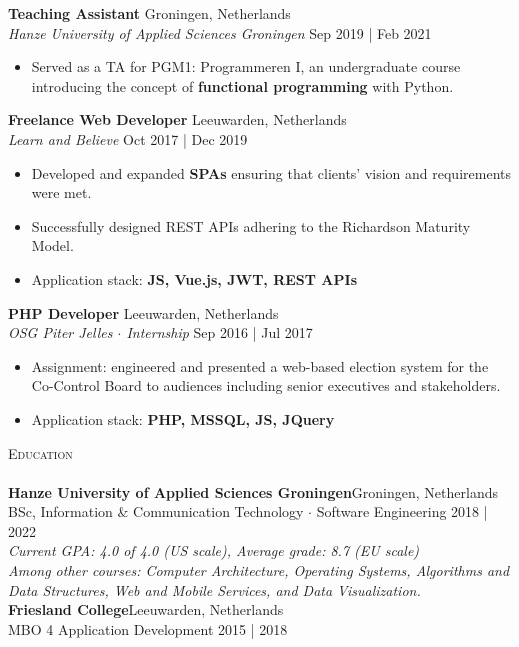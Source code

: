 \documentclass[a4paper]{article}
\newcommand{\lineunder} {
    \vspace*{-8pt} \\
    \hspace*{-18pt} \hrulefill \\
}
\newcommand{\header} [1] {
    {\hspace*{-18pt}\vspace*{6pt} \textsc{#1}}
    \vspace*{-6pt} \lineunder
}
\begin{document}
\textbf{Teaching Assistant} \hfill Groningen, Netherlands\\
\textit{ Hanze University of Applied Sciences Groningen} \hfill Sep 2019 | Feb 2021\\
\vspace{-1mm}
\begin{itemize} \itemsep 1pt
	\item Served as a TA for PGM1: Programmeren I, an undergraduate course introducing the concept of \textbf{functional programming} with Python.
\end{itemize}
\textbf{Freelance Web Developer} \hfill Leeuwarden, Netherlands\\
\textit{Learn and Believe} \hfill Oct 2017 | Dec 2019\\
\vspace{-1mm}
\begin{itemize} \itemsep 1pt
	\item Developed and expanded \textbf{SPAs} ensuring that clients' vision and requirements were met.
    \item Successfully designed REST APIs adhering to the Richardson Maturity Model.
	\item Application stack: \textbf{JS, Vue.js, JWT, REST APIs}
\end{itemize}
\textbf{PHP Developer} \hfill Leeuwarden, Netherlands\\
\textit{OSG Piter Jelles $\cdot$ Internship} \hfill Sep 2016 | Jul 2017\\
\vspace{-1mm}
\begin{itemize} \itemsep 1pt
	\item Assignment: engineered and presented a web-based election system for the Co-Control Board to audiences including senior executives and stakeholders.
	\item Application stack: \textbf{PHP, MSSQL, JS, JQuery}
\end{itemize}

\vspace{5mm}

\header{Education}
\vspace{2mm}
\textbf{Hanze University of Applied Sciences Groningen}\hfill Groningen, Netherlands\\
BSc, Information \& Communication Technology $\cdot$ Software Engineering \hfill 2018 | 2022\\
\vspace{1mm}
\emph{Current GPA: 4.0 of 4.0 (US scale), Average grade: 8.7 (EU scale)}\\
\vspace{1mm}
\emph{Among other courses: Computer Architecture, Operating Systems, Algorithms and Data Structures, Web and Mobile Services, and Data Visualization.}\\
\vspace{2mm}
\textbf{Friesland College}\hfill Leeuwarden, Netherlands\\
MBO 4 Application Development \hfill 2015 | 2018\\
\end{document}
